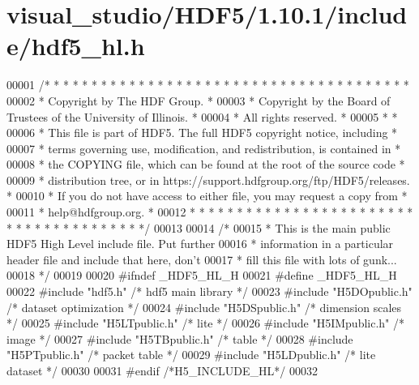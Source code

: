 \hypertarget{visual__studio_2_h_d_f5_21_810_81_2include_2hdf5__hl_8h_source}{}\section{visual\+\_\+studio/\+H\+D\+F5/1.10.1/include/hdf5\+\_\+hl.h}
\label{visual__studio_2_h_d_f5_21_810_81_2include_2hdf5__hl_8h_source}

\begin{DoxyCode}
00001 \textcolor{comment}{/* * * * * * * * * * * * * * * * * * * * * * * * * * * * * * * * * * * * * * *}
00002 \textcolor{comment}{ * Copyright by The HDF Group.                                               *}
00003 \textcolor{comment}{ * Copyright by the Board of Trustees of the University of Illinois.         *}
00004 \textcolor{comment}{ * All rights reserved.                                                      *}
00005 \textcolor{comment}{ *                                                                           *}
00006 \textcolor{comment}{ * This file is part of HDF5.  The full HDF5 copyright notice, including     *}
00007 \textcolor{comment}{ * terms governing use, modification, and redistribution, is contained in    *}
00008 \textcolor{comment}{ * the COPYING file, which can be found at the root of the source code       *}
00009 \textcolor{comment}{ * distribution tree, or in https://support.hdfgroup.org/ftp/HDF5/releases.  *}
00010 \textcolor{comment}{ * If you do not have access to either file, you may request a copy from     *}
00011 \textcolor{comment}{ * help@hdfgroup.org.                                                        *}
00012 \textcolor{comment}{ * * * * * * * * * * * * * * * * * * * * * * * * * * * * * * * * * * * * * * */}
00013 
00014 \textcolor{comment}{/*}
00015 \textcolor{comment}{ * This is the main public HDF5 High Level include file.  Put further}
00016 \textcolor{comment}{ * information in a particular header file and include that here, don't}
00017 \textcolor{comment}{ * fill this file with lots of gunk...}
00018 \textcolor{comment}{ */}
00019 
00020 \textcolor{preprocessor}{#ifndef \_HDF5\_HL\_H}
00021 \textcolor{preprocessor}{#define \_HDF5\_HL\_H}
00022 \textcolor{preprocessor}{#include "hdf5.h"}       \textcolor{comment}{/* hdf5 main library */}
00023 \textcolor{preprocessor}{#include "H5DOpublic.h"} \textcolor{comment}{/* dataset optimization */}
00024 \textcolor{preprocessor}{#include "H5DSpublic.h"} \textcolor{comment}{/* dimension scales */}
00025 \textcolor{preprocessor}{#include "H5LTpublic.h"} \textcolor{comment}{/* lite */}
00026 \textcolor{preprocessor}{#include "H5IMpublic.h"} \textcolor{comment}{/* image */}
00027 \textcolor{preprocessor}{#include "H5TBpublic.h"} \textcolor{comment}{/* table */}
00028 \textcolor{preprocessor}{#include "H5PTpublic.h"} \textcolor{comment}{/* packet table */}
00029 \textcolor{preprocessor}{#include "H5LDpublic.h"} \textcolor{comment}{/* lite dataset */}
00030 
00031 \textcolor{preprocessor}{#endif }\textcolor{comment}{/*H5\_INCLUDE\_HL*/}\textcolor{preprocessor}{}
00032 
\end{DoxyCode}
